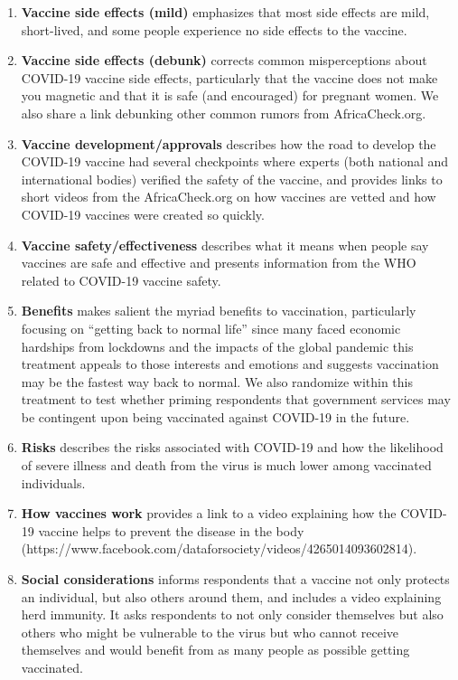 \documentclass[letterpaper, 12pt, parskip=full,DIV=10]{scrartcl}
\begin{document}
\begin{enumerate}
  \item \textbf{Vaccine side effects (mild)} emphasizes that most side effects are mild, short-lived, and some people experience no side effects to the vaccine. 
  \item \textbf{Vaccine side effects (debunk)} corrects common misperceptions about COVID-19 vaccine side effects, particularly that the vaccine does not make you magnetic and that it is safe (and encouraged) for pregnant women. We also share a link debunking other common rumors from AfricaCheck.org.
  \item \textbf{Vaccine development/approvals} describes how the road to develop the COVID-19 vaccine had several checkpoints where experts (both national and international bodies) verified the safety of the vaccine, and provides links to short videos from the AfricaCheck.org on how vaccines are vetted and how COVID-19 vaccines were created so quickly. 
  \item \textbf{Vaccine safety/effectiveness} describes what it means when people say vaccines are safe and effective and presents information from the WHO related to COVID-19 vaccine safety.
  \item \textbf{Benefits} makes salient the myriad benefits to vaccination, particularly focusing on “getting back to normal life” since many faced economic hardships from lockdowns and the impacts of the global pandemic this treatment appeals to those interests and emotions and suggests vaccination may be the fastest way back to normal. We also randomize within this treatment to test whether priming respondents that government services may be contingent upon being vaccinated against COVID-19 in the future.
  \item \textbf{Risks} describes the risks associated with COVID-19 and how the likelihood of severe illness and death from the virus is much lower among vaccinated individuals.
  \item \textbf{How vaccines work} provides a link to a video explaining how the COVID-19 vaccine helps to prevent the disease in the body (https://www.facebook.com/dataforsociety/videos/4265014093602814). 
  \item \textbf{Social considerations} informs respondents that a vaccine not only protects an individual, but also others around them, and includes a video explaining herd immunity. It asks respondents to not only consider themselves but also others who might be vulnerable to the virus but who cannot receive themselves and would benefit from as many people as possible getting vaccinated.

\end{enumerate}
\end{document}
